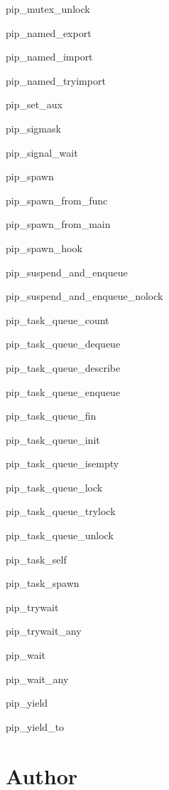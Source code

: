\documentclass[twoside]{book}
\begin{document}
\begin{DoxyItemize}
\item pip\-\_\-mutex\-\_\-unlock
\item pip\-\_\-named\-\_\-export
\item pip\-\_\-named\-\_\-import
\item pip\-\_\-named\-\_\-tryimport
\item pip\-\_\-set\-\_\-aux
\item pip\-\_\-sigmask
\item pip\-\_\-signal\-\_\-wait
\item pip\-\_\-spawn
\item pip\-\_\-spawn\-\_\-from\-\_\-func
\item pip\-\_\-spawn\-\_\-from\-\_\-main
\item pip\-\_\-spawn\-\_\-hook
\item pip\-\_\-suspend\-\_\-and\-\_\-enqueue
\item pip\-\_\-suspend\-\_\-and\-\_\-enqueue\-\_\-nolock
\item pip\-\_\-task\-\_\-queue\-\_\-count
\item pip\-\_\-task\-\_\-queue\-\_\-dequeue
\item pip\-\_\-task\-\_\-queue\-\_\-describe
\item pip\-\_\-task\-\_\-queue\-\_\-enqueue
\item pip\-\_\-task\-\_\-queue\-\_\-fin
\item pip\-\_\-task\-\_\-queue\-\_\-init
\item pip\-\_\-task\-\_\-queue\-\_\-isempty
\item pip\-\_\-task\-\_\-queue\-\_\-lock
\item pip\-\_\-task\-\_\-queue\-\_\-trylock
\item pip\-\_\-task\-\_\-queue\-\_\-unlock
\item pip\-\_\-task\-\_\-self
\item pip\-\_\-task\-\_\-spawn
\item pip\-\_\-trywait
\item pip\-\_\-trywait\-\_\-any
\item pip\-\_\-wait
\item pip\-\_\-wait\-\_\-any
\item pip\-\_\-yield
\item pip\-\_\-yield\-\_\-to
\end{DoxyItemize}

\section*{Author}
\end{document}
